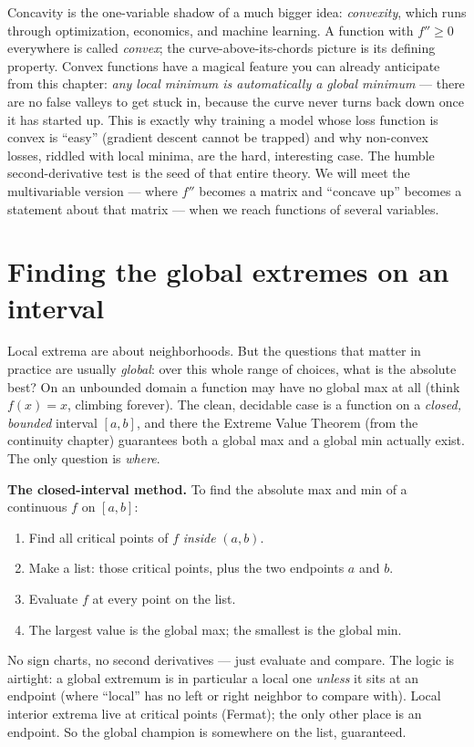 \begin{connectionbox}
Concavity is the one-variable shadow of a much bigger idea: \emph{convexity}, which
runs through optimization, economics, and machine learning. A function with
$f''\ge0$ everywhere is called \emph{convex}; the curve-above-its-chords picture is
its defining property. Convex functions have a magical feature you can already
anticipate from this chapter: \emph{any local minimum is automatically a global
minimum} --- there are no false valleys to get stuck in, because the curve never
turns back down once it has started up. This is exactly why training a model whose
loss function is convex is ``easy'' (gradient descent cannot be trapped) and why
non-convex losses, riddled with local minima, are the hard, interesting case. The
humble second-derivative test is the seed of that entire theory. We will meet the
multivariable version --- where $f''$ becomes a matrix and ``concave up'' becomes a
statement about that matrix --- when we reach functions of several variables.
\end{connectionbox}

\section{Finding the global extremes on an interval}

Local extrema are about neighborhoods. But the questions that matter in practice
are usually \emph{global}: over this whole range of choices, what is the absolute
best? On an unbounded domain a function may have no global max at all (think
$f(x)=x$, climbing forever). The clean, decidable case is a function on a
\emph{closed, bounded} interval $[a,b]$, and there the Extreme Value Theorem
(from the continuity chapter) guarantees both a global max and a global min
actually exist. The only question is \emph{where}.

\begin{focusbox}
\textbf{The closed-interval method.} To find the absolute max and min of a
continuous $f$ on $[a,b]$:
\begin{enumerate}
\item Find all critical points of $f$ \emph{inside} $(a,b)$.
\item Make a list: those critical points, plus the two endpoints $a$ and $b$.
\item Evaluate $f$ at every point on the list.
\item The largest value is the global max; the smallest is the global min.
\end{enumerate}
No sign charts, no second derivatives --- just evaluate and compare. The logic is
airtight: a global extremum is in particular a local one \emph{unless} it sits at
an endpoint (where ``local'' has no left or right neighbor to compare with). Local
interior extrema live at critical points (Fermat); the only other place is an
endpoint. So the global champion is somewhere on the list, guaranteed.
\end{focusbox}

